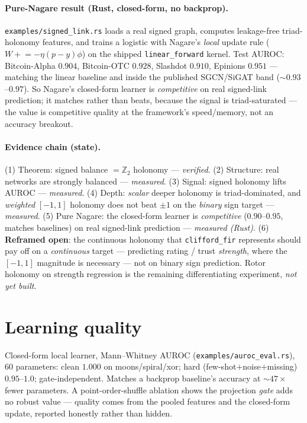 \documentclass[11pt]{article}
\theoremstyle{definition}\newtheorem{remark}{Remark}
\begin{document}
\paragraph{Pure-Nagare result (Rust, closed-form, no backprop).}
\texttt{examples/signed\_link.rs} loads a real signed graph, computes leakage-free
triad-holonomy features, and trains a logistic with Nagare's \emph{local} update
rule ($W\mathrel{+}=-\eta(p-y)\phi$) on the shipped \texttt{linear\_forward}
kernel. Test AUROC: Bitcoin-Alpha $0.904$, Bitcoin-OTC $0.928$, Slashdot $0.910$,
Epinions $0.951$ --- matching the linear baseline and inside the published
SGCN/SiGAT band ($\sim0.93$--$0.97$). So Nagare's closed-form learner is
\emph{competitive} on real signed-link prediction; it matches rather than beats,
because the signal is triad-saturated --- the value is competitive quality at the
framework's speed/memory, not an accuracy breakout.

\paragraph{Evidence chain (state).}
(1) Theorem: signed balance $=\mathbb{Z}_2$ holonomy --- \emph{verified}.
(2) Structure: real networks are strongly balanced --- \emph{measured}.
(3) Signal: signed holonomy lifts AUROC --- \emph{measured}.
(4) Depth: \emph{scalar} deeper holonomy is triad-dominated, and \emph{weighted}
$[-1,1]$ holonomy does not beat $\pm1$ on the \emph{binary} sign target ---
\emph{measured}.
(5) Pure Nagare: the closed-form learner is \emph{competitive} ($0.90$--$0.95$,
matches baselines) on real signed-link prediction --- \emph{measured (Rust)}.
(6) \textbf{Reframed open}: the continuous holonomy that \texttt{clifford\_fir}
represents should pay off on a \emph{continuous} target --- predicting rating /
trust \emph{strength}, where the $[-1,1]$ magnitude is necessary --- not on binary
sign prediction. Rotor holonomy on strength regression is the remaining
differentiating experiment, \emph{not yet built}.

\section{Learning quality}
Closed-form local learner, Mann--Whitney AUROC (\texttt{examples/auroc\_eval.rs}),
$60$ parameters: clean $1.000$ on moons/spiral/xor; hard (few-shot$+$noise$+$missing)
$0.95$--$1.0$; gate-independent. Matches a backprop baseline's accuracy at
$\sim47\times$ fewer parameters. A point-order-shuffle ablation shows the
projection \emph{gate} adds no robust value --- quality comes from the pooled
features and the closed-form update, reported honestly rather than hidden.
\end{document}
